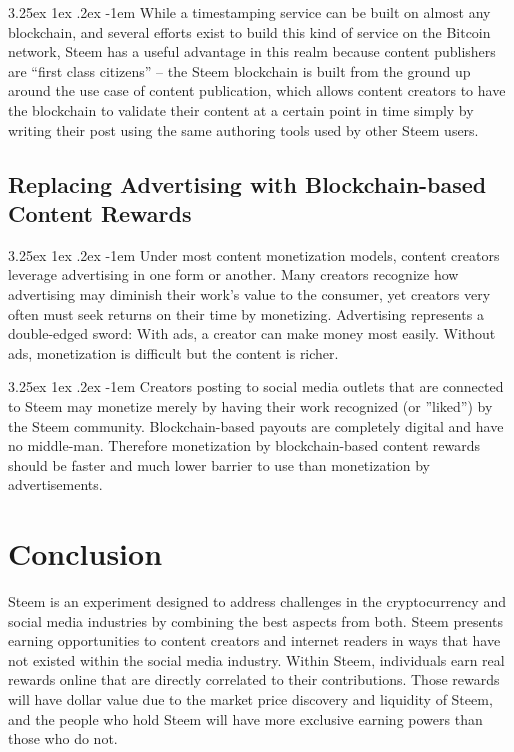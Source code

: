 \documentclass{article}
\makeatletter
\renewcommand\paragraph{\@startsection{paragraph}{5}{\z@}%
  {3.25ex \@plus1ex \@minus.2ex}%
  {-1em}%
  {\normalfont\normalsize\bfseries}}
\makeatother
\begin{document}
			\paragraph{}
				While a timestamping service can be built on almost any blockchain, and several efforts exist to build this kind of service on the Bitcoin network, Steem has a useful advantage in this realm because content publishers are “first class citizens” -- the Steem blockchain is built from the ground up around the use case of content publication, which allows content creators to have the blockchain to validate their content at a certain point in time simply by writing their post using the same authoring tools used by other Steem users.

		\subsection{Replacing Advertising with Blockchain-based Content Rewards}

			\paragraph{}
				Under most content monetization models, content creators leverage advertising in one form or another. Many creators recognize how advertising may diminish their work’s value to the consumer, yet creators very often must seek returns on their time by monetizing. Advertising represents a double-edged sword: With ads, a creator can make money most easily. Without ads, monetization is difficult but the content is richer.

			\paragraph{}
				Creators posting to social media outlets that are connected to Steem may monetize merely by having their work recognized (or ”liked”) by the Steem community. Blockchain-based payouts are completely digital and have no middle-man. Therefore monetization by blockchain-based content rewards should be faster and much lower barrier to use than monetization by advertisements.

	\section{Conclusion}
		Steem is an experiment designed to address challenges in the cryptocurrency and social media industries by combining the best aspects from both. Steem presents earning opportunities to content creators and internet readers in ways that have not existed within the social media industry. Within Steem, individuals earn real rewards online that are directly correlated to their contributions. Those rewards will have dollar value due to the market price discovery and liquidity of Steem, and the people who hold Steem will have more exclusive earning powers than those who do not.
\end{document}
